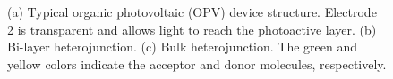 \documentclass[12pt]{article}
\begin{document}
\begin{figure}[H]
\centering
{}
\caption{(a) Typical organic photovoltaic (OPV) device structure. Electrode 2 is transparent and allows light to reach the photoactive layer. (b) Bi-layer heterojunction. (c) Bulk heterojunction. The green and yellow colors indicate the acceptor and donor molecules, respectively.}\label{fig:OPV devices}
\end{figure}
\end{document}
